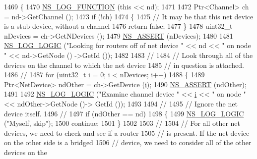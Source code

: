 \begin{DoxyCode}
1469 \{
1470   \hyperlink{log-macros-disabled_8h_a90b90d5bad1f39cb1b64923ea94c0761}{NS\_LOG\_FUNCTION} (\textcolor{keyword}{this} << nd);
1471 
1472   Ptr<Channel> ch = nd->GetChannel ();
1473   \textcolor{keywordflow}{if} (!ch)
1474     \{
1475       \textcolor{comment}{// It may be that this net device is a stub device, without a channel}
1476       \textcolor{keywordflow}{return} \textcolor{keyword}{false};
1477     \}
1478   uint32\_t nDevices = ch->GetNDevices ();
1479   \hyperlink{assert_8h_a6dccdb0de9b252f60088ce281c49d052}{NS\_ASSERT} (nDevices);
1480 
1481   \hyperlink{group__logging_ga88acd260151caf2db9c0fc84997f45ce}{NS\_LOG\_LOGIC} (\textcolor{stringliteral}{"Looking for routers off of net device "} << nd << \textcolor{stringliteral}{" on node "} << nd->GetNode ()
      ->GetId ());
1482 
1483   \textcolor{comment}{//}
1484   \textcolor{comment}{// Look through all of the devices on the channel to which the net device}
1485   \textcolor{comment}{// in question is attached.}
1486   \textcolor{comment}{//}
1487   \textcolor{keywordflow}{for} (uint32\_t \hyperlink{bernuolliDistribution_8m_a6f6ccfcf58b31cb6412107d9d5281426}{i} = 0; \hyperlink{bernuolliDistribution_8m_a6f6ccfcf58b31cb6412107d9d5281426}{i} < nDevices; \hyperlink{bernuolliDistribution_8m_a6f6ccfcf58b31cb6412107d9d5281426}{i}++)
1488     \{
1489       Ptr<NetDevice> ndOther = ch->GetDevice (\hyperlink{bernuolliDistribution_8m_a6f6ccfcf58b31cb6412107d9d5281426}{i});
1490       \hyperlink{assert_8h_a6dccdb0de9b252f60088ce281c49d052}{NS\_ASSERT} (ndOther);
1491 
1492       \hyperlink{group__logging_ga88acd260151caf2db9c0fc84997f45ce}{NS\_LOG\_LOGIC} (\textcolor{stringliteral}{"Examine channel device "} << \hyperlink{bernuolliDistribution_8m_a6f6ccfcf58b31cb6412107d9d5281426}{i} << \textcolor{stringliteral}{" on node "} << ndOther->GetNode ()->
      GetId ());
1493 
1494       \textcolor{comment}{// }
1495       \textcolor{comment}{// Ignore the net device itself.}
1496       \textcolor{comment}{//}
1497       \textcolor{keywordflow}{if} (ndOther == nd)
1498         \{
1499           \hyperlink{group__logging_ga88acd260151caf2db9c0fc84997f45ce}{NS\_LOG\_LOGIC} (\textcolor{stringliteral}{"Myself, skip"});
1500           \textcolor{keywordflow}{continue};
1501         \}
1502 
1503       \textcolor{comment}{//}
1504       \textcolor{comment}{// For all other net devices, we need to check and see if a router}
1505       \textcolor{comment}{// is present.  If the net device on the other side is a bridged}
1506       \textcolor{comment}{// device, we need to consider all of the other devices on the }

\end{DoxyCode}
